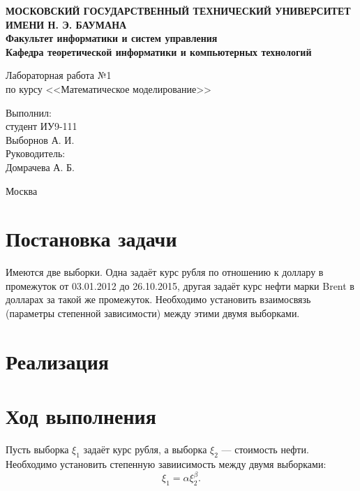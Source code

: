 \documentclass[12pt,a4paper,oneside]{extarticle}
\begin{document}
\pgfplotsset{compat=1.8}

\thispagestyle{empty}
\newpage
{
\centering


\textbf{
МОСКОВСКИЙ ГОСУДАРСТВЕННЫЙ ТЕХНИЧЕСКИЙ УНИВЕРСИТЕТ ИМЕНИ Н. Э. БАУМАНА \\
Факультет информатики и систем управления \\
Кафедра теоретической информатики и компьютерных технологий}
\bigskip
\bigskip
\bigskip
\bigskip
\bigskip
\bigskip
\bigskip

\vfill


Лабораторная работа №1 \\
по курсу <<Математическое моделирование>>

\bigskip

\bigskip

\vfill



\hfill\parbox{4cm} {
Выполнил:\\
студент ИУ9-111 \hfill \\
Выборнов А. И.\hfill \medskip\\
Руководитель:\\
Домрачева А. Б.\hfill
}


\vspace{\fill}

Москва \number\year
\clearpage
}



\clearpage


\section{Постановка задачи}
    Имеются две выборки. Одна задаёт курс рубля по отношению к доллару в промежуток от 03.01.2012 до 26.10.2015, другая задаёт курс нефти марки Brent в долларах за такой же промежуток. Необходимо установить взаимосвязь (параметры степенной зависимости) между этими двумя выборками.
    


\section{Реализация}

\section{Ход выполнения}

    Пусть выборка $\xi_1$ задаёт курс рубля, а выборка $\xi_2$ --- стоимость нефти.
    Необходимо установить степенную завиисимость между двумя выборками: $$\xi_1=\alpha\xi_2^{\beta}.$$
\end{document}
